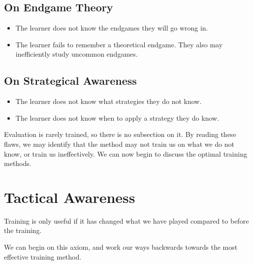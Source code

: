 \documentclass{article}
\begin{document}
\subsection{On Endgame Theory}
\begin{itemize}
  \item The learner does not know the endgames they will go wrong in.
  \item The learner fails to remember a theoretical endgame. They also may inefficiently study uncommon endgames.
\end{itemize}
\subsection{On Strategical Awareness}
\begin{itemize}
  \item The learner does not know what strategies they do not know.
  \item The learner does not know when to apply a strategy they do know.
\end{itemize}

Evaluation is rarely trained, so there is no subsection on it. By reading these flaws, we may identify that the method may not train us on what we do not know, or train us ineffectively. We can now begin to discuss the optimal training methods.

\section{Tactical Awareness}
Training is only useful if it has changed what we have played compared to before the training.

We can begin on this axiom, and work our ways backwards towards the most effective training method.

\begin{center}
\end{center}
\end{document}

